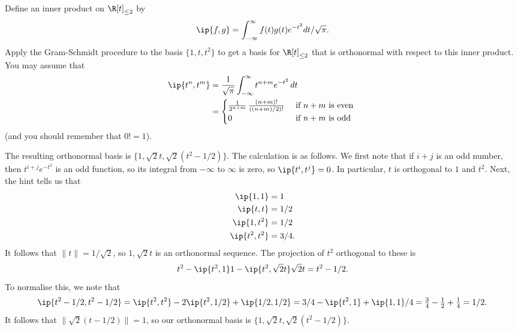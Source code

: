 \begin{exercise}\label{ex-orthonormal-quad}
 Define an inner product on $\R[t]_{\leq 2}$ by 
 \[ \ip{f,g} =
     \int_{-\infty}^\infty f(t)g(t)e^{-t^2}dt/\sqrt{\pi}.
 \]
 Apply the Gram-Schmidt procedure to the basis $\{1,t,t^2\}$
 to get a basis for $\R[t]_{\leq 2}$ that is orthonormal
 with respect to this inner product.  You may assume that
 \begin{align*}
  \ip{t^n,t^m} &= 
    \frac{1}{\sqrt{\pi}} \int_{-\infty}^\infty t^{n+m} e^{-t^2}\,dt \\
   &= 
    \begin{cases}
     \frac{1}{2^{n+m}} \,\frac{(n+m)!}{((n+m)/2)!} &
      \text{ if $n+m$ is even } \\
     0 & \text{ if $n+m$ is odd }
    \end{cases}
 \end{align*}
 (and you should remember that $0!=1$).  
\end{exercise}
\begin{solution}
 The resulting orthonormal basis is 
 $\{1,\sqrt{2}t,\sqrt{2}(t^2-1/2)\}$.  The calculation is as
 follows.  We first note that if $i+j$ is an odd number, then
 $t^{i+j}e^{-t^2}$ is an odd function, so its integral from
 $-\infty$ to $\infty$ is zero, so $\ip{t^i,t^j}=0$.  In
 particular, $t$ is orthogonal to $1$ and $t^2$.  Next,
 the hint tells us that
 \begin{align*}
  \ip{1,1} &= 1 \\
  \ip{t,t} &= 1/2 \\
  \ip{1,t^2} &= 1/2 \\
  \ip{t^2,t^2} &= 3/4.
 \end{align*}
 It follows that $\|t\|=1/\sqrt{2}$, so $1,\sqrt{2}t$ is an
 orthonormal sequence.  The projection of $t^2$ orthogonal
 to these is
 \[
  t^2 - \ip{t^2,1}1 - \ip{t^2,\sqrt{2}t} \sqrt{2}t 
   = t^2 - 1/2.
 \]
 To normalise this, we note that
 \[ \ip{t^2-1/2,t^2-1/2} = 
     \ip{t^2,t^2} - 2\ip{t^2,1/2} + \ip{1/2,1/2} = 
     3/4 - \ip{t^2,1} + \ip{1,1}/4 = 
     \tfrac{3}{4} - \tfrac{1}{2} + \tfrac{1}{4} = 1/2.
 \]
 It follows that $\|\sqrt{2}(t-1/2)\|=1$, so our orthonormal
 basis is $\{1,\sqrt{2}t,\sqrt{2}(t^2-1/2)\}$.
\end{solution}


